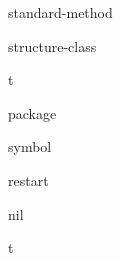 \begin{class}{standard-method}{}
  
\end{class}

\begin{class}{structure-class}{}
  
\end{class}

\begin{class}{t}{}
  
\end{class}

\begin{class}{package}{}
  
\end{class}

\begin{class}{symbol}{}
  
\end{class}

\begin{class}{restart}{}
  
\end{class}

\begin{constant}{nil}{}
  
\end{constant}

\begin{constant}{t}{}
  
\end{constant}


